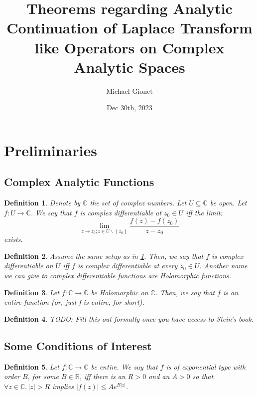 \documentclass{article}
\title{Theorems regarding Analytic Continuation of Laplace Transform like Operators on Complex Analytic Spaces}
\author{Michael Gionet}
\date{Dec 30th, 2023}
\newtheorem{definition}{Definition}
\begin{document}
	\maketitle
	
	\section{Preliminaries}
	
	\subsection{Complex Analytic Functions}
	
	\begin{definition} \label{def_complex_diff_point}
		Denote by $\mathbb{C}$ the set of complex numbers. 
		Let $ U \subseteq \mathbb{C} $ be open. 
		Let $ f : U \rightarrow \mathbb{C} $. 
		We say that $f$ is complex differentiable at $z_0 \in U$ iff the limit:
		$$ \lim_{ z \rightarrow z_0; z \in U \backslash \left\{ z_0 \right\} } \frac{ f(z) - f(z_0) }{ z - z_0 } $$
		exists. 
	\end{definition}

	\begin{definition} \label{ def_complex_diff_domain }
		Assume the same setup as in \ref{def_complex_diff_point}. Then, we say that $f$ is complex differentiable on $U$ iff $f$ is complex differentiable at every $z_0 \in U$. Another name we can give to complex differentiable functions are Holomorphic functions. 
	\end{definition}

	\begin{definition} \label{ def_entire_function }
		Let $f : \mathbb{C} \rightarrow \mathbb{C}$ be Holomorphic on $\mathbb{C}$. Then, we say that $f$ is an entire function (or, just f is entire, for short).
	\end{definition}

	\begin{definition} \label{ def_meromorphic }
		TODO: Fill this out formally once you have access to Stein's book.
	\end{definition}

	\subsection{ Some Conditions of Interest }
	
	\begin{definition} \label{ def_exponential_type }
		Let $f : \mathbb{C} \rightarrow \mathbb{C}$ be entire. We say that $f$ is of exponential type with order $B$, for some $B \in \mathbb{R}$, iff there is an $R > 0$ and an $A > 0$ so that $\forall z \in \mathbb{C}, \left| z \right| > R $ implies $ \left| f(z) \right| \leq A e^{ B \left| z \right| } $.
	\end{definition}
\end{document}
